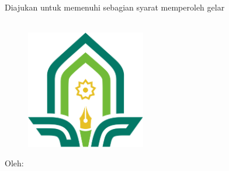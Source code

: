 %

%
%

\begin{titlepage}
    \begin{center}

        \vspace*{.5cm}
        {\large \bo{\Judul \\}} %

        \vspace*{1cm}
        \bo{\MakeUppercase{\Type}} \\

        \vspace*{1cm}
        Diajukan untuk memenuhi sebagian syarat memperoleh gelar \\
        \gelar\\

        \vspace*{1cm}
        \begin{figure}
            \begin{center}
                \includegraphics[width=5.22cm]{assets/pics/logo-color.ps}
            \end{center}
        \end{figure}

        \vspace*{1cm}
        Oleh:\\
        \underline{\bo{\Penulis}} \\
         \\

        \vfill

        {\large {}}
    \end{center}
\end{titlepage}
